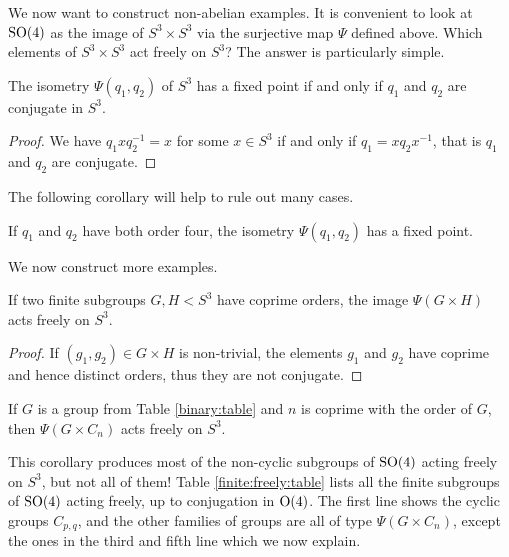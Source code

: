 We now want to construct non-abelian examples. It is convenient to look at ${\rm SO}(4)$ as the image of $S^3\times S^3$ via the surjective map $\Psi$ defined above. Which elements of $S^3\times S^3$ act freely on $S^3$? The answer is particularly simple.
\begin{prop} \label{conj:fixed:prop}
The isometry $\Psi(q_1,q_2)$ of $S^3$ has a fixed point if and only if $q_1$ and $q_2$ are conjugate in $S^3$.
\end{prop}
\begin{proof}
We have $q_1xq_2^{-1}=x$ for some $x\in S^3$ if and only if $q_1 = xq_2x^{-1}$, that is $q_1$ and $q_2$ are conjugate.
\end{proof}
The following corollary will help to rule out many cases.
\begin{cor} \label{no:four:cor}
If $q_1$ and $q_2$ have both order four, the isometry $\Psi(q_1,q_2)$ has a fixed point.
\end{cor}
We now construct more examples.
\begin{prop} If two finite subgroups $G,H < S^3$ have coprime orders, the image $\Psi(G \times H)$ acts freely on $S^3$.
\end{prop}
\begin{proof}
If $(g_1, g_2) \in G \times H$ is non-trivial, the elements $g_1$ and $g_2$ have coprime and hence distinct orders, thus they are not conjugate.
\end{proof}
\begin{cor}
If $G$ is a group from Table \ref{binary:table} and $n$ is coprime with the order of $G$, then $\Psi(G\times C_n)$ acts freely on $S^3$.
\end{cor}
This corollary produces most of the non-cyclic subgroups of ${\rm SO}(4)$ acting freely on $S^3$, but not all of them! Table \ref{finite:freely:table} lists all the finite subgroups of ${\rm SO}(4)$ acting freely, up to conjugation in ${\rm O}(4)$. The first line shows the cyclic groups $C_{p,q}$, and the other families of groups are all of type $\Psi(G\times C_n)$, except the ones in the third and fifth line which we now explain.

